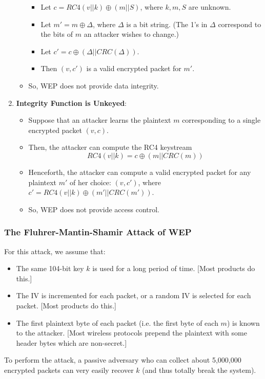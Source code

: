\documentclass[12pt,titlepage]{article}
\begin{document}
\begin{enumerate}
\begin{itemize}
\begin{itemize}
\item Let $c = RC4(v||k) \oplus (m||S)$, where $k, m, S$ are unknown.
\item Let $m' = m \oplus \Delta $, where $\Delta$ is a bit string. (The 1’s in $\Delta$ correspond to the bits of $m$ an attacker wishes to change.)
\item Let $c' = c \oplus (\Delta || CRC(\Delta))$.
\item Then $(v, c')$ is a valid encrypted packet for $m'$.
\end{itemize}
\item So, WEP does not provide data integrity.
\end{itemize}
\item \textbf{Integrity Function is Unkeyed}: \begin{itemize}
\item Suppose that an attacker learns the plaintext $m$ corresponding to a single encrypted packet $(v, c)$.
\item Then, the attacker can compute the RC4 keystream $$RC4(v||k) = c \oplus (m||CRC(m))$$
\item Henceforth, the attacker can compute a valid encrypted packet for any plaintext $m'$ of her choice: $(v, c')$, where $c' = RC4(v||k) \oplus (m'||CRC(m'))$. 
\item So, WEP does not provide access control.
\end{itemize}
\end{enumerate}

\subsubsection{The Fluhrer-Mantin-Shamir Attack of WEP}
For this attack, we assume that: \begin{itemize}
\item The same 104-bit key $k$ is used for a long period of time. [Most products do this.]
\item The IV is incremented for each packet, or a random IV is selected for each packet. [Most products do this.]
\item The first plaintext byte of each packet (i.e. the first byte of each $m$) is known to the attacker.
[Most wireless protocols prepend the plaintext with some header bytes which are non-secret.]
\end{itemize}

To perform the attack, a passive adversary who can collect about 5,000,000 encrypted packets can very easily recover $k$ (and thus totally break the system).
\end{document}
